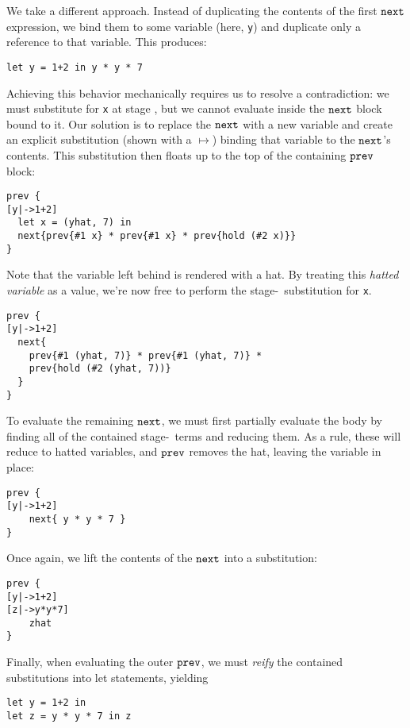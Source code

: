 We take a different approach.  
Instead of duplicating the contents of the first ${\tt next}$ expression, we bind them to some variable (here, {\tt y}) and
duplicate only a reference to that variable.  This produces:
\begin{lstlisting} 
let y = 1+2 in y * y * 7
\end{lstlisting}


Achieving this behavior mechanically requires us to resolve a contradiction:
we must substitute for \texttt{x} at stage \bbone, but we cannot evaluate inside the ${\tt next}$ block bound to it. 
Our solution is to replace the ${\tt next}$ with a new variable and create an explicit substitution (shown with a $\mapsto$) binding that variable to the ${\tt next}$'s contents.  
This substitution then floats up to the top of the containing ${\tt prev}$ block:
\begin{lstlisting} 
prev {
[y|->1+2]
  let x = (yhat, 7) in
  next{prev{#1 x} * prev{#1 x} * prev{hold (#2 x)}}
}
\end{lstlisting}
Note that the variable left behind is rendered with a hat.  By treating this {\em hatted variable} as a value, we're now free to perform the stage-\bbone~substitution for {\tt x}.  
\begin{lstlisting} 
prev {
[y|->1+2]
  next{
    prev{#1 (yhat, 7)} * prev{#1 (yhat, 7)} *
    prev{hold (#2 (yhat, 7))}
  }
}
\end{lstlisting}
To evaluate the remaining ${\tt next}$, we must first partially evaluate the body by finding all of the contained stage-\bbone~terms and reducing them. 
As a rule, these will reduce to hatted variables, and ${\tt prev}$ removes the hat, leaving the variable in place:
\begin{lstlisting} 
prev {
[y|->1+2]
    next{ y * y * 7 }
}
\end{lstlisting}
Once again, we lift the contents of the ${\tt next}$ into a substitution:
\begin{lstlisting} 
prev {
[y|->1+2]
[z|->y*y*7]
    zhat
}
\end{lstlisting}
Finally, when evaluating the outer ${\tt prev}$, we must {\em reify} the contained substitutions into let statements, yielding
\begin{lstlisting} 
let y = 1+2 in
let z = y * y * 7 in z
\end{lstlisting}

